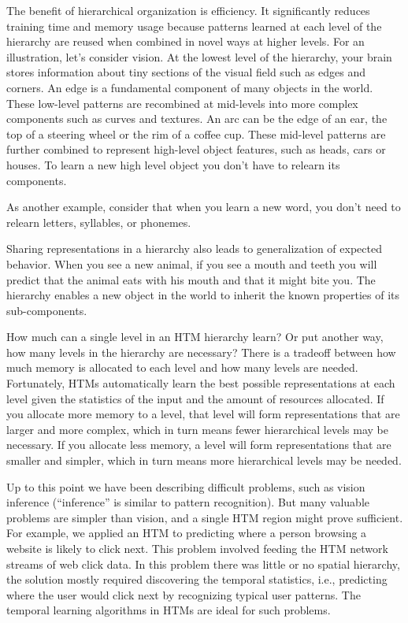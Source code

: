 \documentclass{report}
\begin{document}
The benefit of hierarchical organization is efficiency. It
significantly reduces training time and memory usage because patterns
learned at each level of the hierarchy are reused when combined in
novel ways at higher levels. For an illustration, let's consider
vision. At the lowest level of the hierarchy, your brain stores
information about tiny sections of the visual field such as edges and
corners. An edge is a fundamental component of many objects in the
world. These low-level patterns are recombined at mid-levels into more
complex components such as curves and textures. An arc can be the edge
of an ear, the top of a steering wheel or the rim of a coffee
cup. These mid-level patterns are further combined to represent
high-level object features, such as heads, cars or houses. To learn a
new high level object you don't have to relearn its components.

As another example, consider that when you learn a new word, you don't
need to relearn letters, syllables, or phonemes.

Sharing representations in a hierarchy also leads to generalization of
expected behavior. When you see a new animal, if you see a mouth and
teeth you will predict that the animal eats with his mouth and that it
might bite you. The hierarchy enables a new object in the world to
inherit the known properties of its sub-components.

How much can a single level in an HTM hierarchy learn? Or put another
way, how many levels in the hierarchy are necessary? There is a
tradeoff between how much memory is allocated to each level and how
many levels are needed. Fortunately, HTMs automatically learn the best
possible representations at each level given the statistics of the
input and the amount of resources allocated. If you allocate more
memory to a level, that level will form representations that are
larger and more complex, which in turn means fewer hierarchical levels
may be necessary. If you allocate less memory, a level will form
representations that are smaller and simpler, which in turn means more
hierarchical levels may be needed.

Up to this point we have been describing difficult problems, such as
vision inference (``inference'' is similar to pattern
recognition). But many valuable problems are simpler than vision, and
a single HTM region might prove sufficient. For example, we applied an
HTM to predicting where a person browsing a website is likely to click
next. This problem involved feeding the HTM network streams of web
click data. In this problem there was little or no spatial hierarchy,
the solution mostly required discovering the temporal statistics,
i.e., predicting where the user would click next by recognizing typical
user patterns. The temporal learning algorithms in HTMs are ideal for
such problems.
\end{document}
